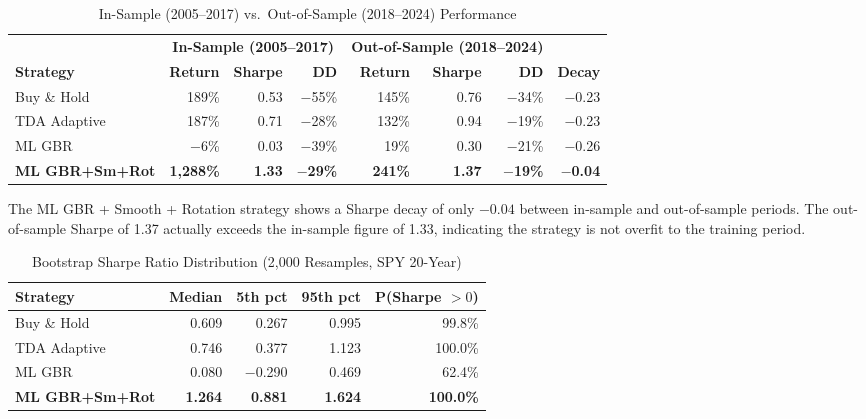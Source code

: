 \documentclass[11pt]{article}
\begin{document}
\begin{table}[ht]
\centering
\caption{In-Sample (2005--2017) vs.\ Out-of-Sample (2018--2024) Performance}
\small
\begin{tabular}{l|rrr|rrr|r}
\toprule
 & \multicolumn{3}{c|}{\textbf{In-Sample (2005--2017)}} & \multicolumn{3}{c|}{\textbf{Out-of-Sample (2018--2024)}} & \\
\textbf{Strategy} & \textbf{Return} & \textbf{Sharpe} & \textbf{DD} & \textbf{Return} & \textbf{Sharpe} & \textbf{DD} & \textbf{Decay} \\
\midrule
\rowcolor{benchbg} Buy \& Hold & 189\% & 0.53 & $-$55\% & 145\% & 0.76 & $-$34\% & $-$0.23 \\
TDA Adaptive & 187\% & 0.71 & $-$28\% & 132\% & 0.94 & $-$19\% & $-$0.23 \\
ML GBR & $-$6\% & 0.03 & $-$39\% & 19\% & 0.30 & $-$21\% & $-$0.26 \\
\rowcolor{bestbg} \textbf{ML GBR+Sm+Rot} & \textbf{1{,}288\%} & \textbf{1.33} & $-$\textbf{29\%} & \textbf{241\%} & \textbf{1.37} & $-$\textbf{19\%} & \textbf{$-$0.04} \\
\bottomrule
\end{tabular}
\end{table}

\noindent The ML GBR + Smooth + Rotation strategy shows a Sharpe decay of only $-0.04$ between in-sample and out-of-sample periods. The out-of-sample Sharpe of 1.37 actually exceeds the in-sample figure of 1.33, indicating the strategy is not overfit to the training period.

\begin{table}[ht]
\centering
\caption{Bootstrap Sharpe Ratio Distribution (2{,}000 Resamples, SPY 20-Year)}
\small
\begin{tabular}{lrrrr}
\toprule
\textbf{Strategy} & \textbf{Median} & \textbf{5th pct} & \textbf{95th pct} & \textbf{P(Sharpe $> 0$)} \\
\midrule
\rowcolor{benchbg} Buy \& Hold & 0.609 & 0.267 & 0.995 & 99.8\% \\
TDA Adaptive & 0.746 & 0.377 & 1.123 & 100.0\% \\
ML GBR & 0.080 & $-$0.290 & 0.469 & 62.4\% \\
\rowcolor{bestbg} \textbf{ML GBR+Sm+Rot} & \textbf{1.264} & \textbf{0.881} & \textbf{1.624} & \textbf{100.0\%} \\
\bottomrule
\end{tabular}
\end{table}
\end{document}
